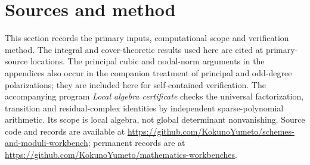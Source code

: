 \documentclass[11pt]{article}
\theoremstyle{definition}\newtheorem{definition}[theorem]{Definition}
\theoremstyle{remark}\newtheorem{remark}[theorem]{Remark}
\newcommand{\workbenchurl}{https://github.com/KokunoYumeto/schemes-and-moduli-workbench}
\newcommand{\recordurl}{https://github.com/KokunoYumeto/mathematics-workbenches}
\begin{document}
\section*{Sources and method}
This section records the primary inputs, computational scope and verification method.
The integral and cover-theoretic results used here are cited at primary-source locations. The principal cubic and nodal-norm arguments in the appendices also occur in the companion treatment of principal and odd-degree polarizations; they are included here for self-contained verification. The accompanying program \emph{Local algebra certificate} checks the universal factorization, transition and residual-complex identities by independent sparse-polynomial arithmetic. Its scope is local algebra, not global determinant nonvanishing. Source code and records are available at \url{\workbenchurl}; permanent records are at \url{\recordurl}.
\end{document}
